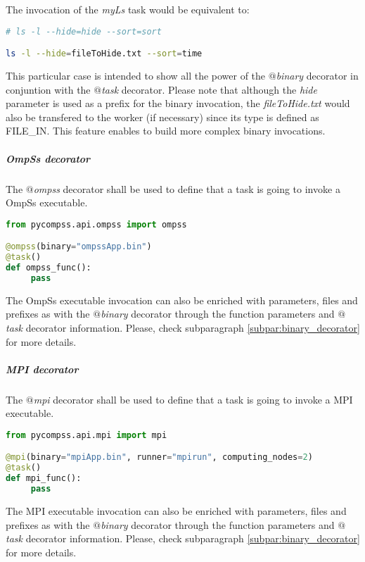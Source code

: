 The invocation of the {\it myLs} task would be equivalent to:

\begin{lstlisting}[language=bash]
# ls -l --hide=hide --sort=sort

ls -l --hide=fileToHide.txt --sort=time
\end{lstlisting}

This particular case is intended to show all the power of the {\it $@$binary} decorator in conjuntion with the
{\it $@$task} decorator. Please note that although the {\it hide} parameter is used as a prefix for the binary invocation,
the {\it fileToHide.txt} would also be transfered to the worker (if necessary) since its type is defined as FILE\_IN. 
This feature enables to build more complex binary invocations.

\subparagraph{OmpSs decorator}
\label{subpar:ompss_decorator}

The {\it $@$ompss} decorator shall be used to define that a task is going to invoke a OmpSs executable.

\begin{lstlisting}[language=python]
from pycompss.api.ompss import ompss

@ompss(binary="ompssApp.bin")
@task()
def ompss_func():
     pass
\end{lstlisting}

The OmpSs executable invocation can also be enriched with parameters, files and prefixes as with the 
{\it $@$binary} decorator through the function parameters and {\it $@$task} decorator information.
Please, check subparagraph \ref{subpar:binary_decorator} for more details.

\subparagraph{MPI decorator}
\label{subpar:mpi_decorator}

The {\it $@$mpi} decorator shall be used to define that a task is going to invoke a MPI executable.

\begin{lstlisting}[language=python]
from pycompss.api.mpi import mpi

@mpi(binary="mpiApp.bin", runner="mpirun", computing_nodes=2)
@task()
def mpi_func():
     pass
\end{lstlisting}

The MPI executable invocation can also be enriched with parameters, files and prefixes as with the 
{\it $@$binary} decorator through the function parameters and {\it $@$task} decorator information.
Please, check subparagraph \ref{subpar:binary_decorator} for more details.

